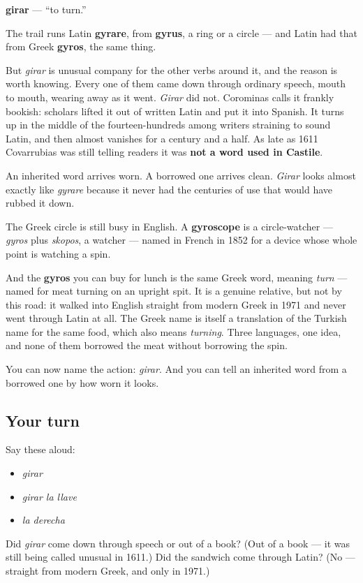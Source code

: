 \begin{cousinweb}
\textbf{girar} — \textquotedblleft{}to turn.\textquotedblright{}

The trail runs Latin \textbf{gyrare}, from \textbf{gyrus}, a ring or a circle — and Latin had that from Greek \textbf{gyros}, the same thing.

But \emph{girar} is unusual company for the other verbs around it, and the reason is worth knowing. Every one of them came down through ordinary speech, mouth to mouth, wearing away as it went. \emph{Girar} did not. Corominas calls it frankly bookish: scholars lifted it out of written Latin and put it into Spanish. It turns up in the middle of the fourteen-hundreds among writers straining to sound Latin, and then almost vanishes for a century and a half. As late as 1611 Covarrubias was still telling readers it was \textbf{not a word used in Castile}.

An inherited word arrives worn. A borrowed one arrives clean. \emph{Girar} looks almost exactly like \emph{gyrare} because it never had the centuries of use that would have rubbed it down.

The Greek circle is still busy in English. A \textbf{gyroscope} is a circle-watcher — \emph{gyros} plus \emph{skopos}, a watcher — named in French in 1852 for a device whose whole point is watching a spin.

And the \textbf{gyros} you can buy for lunch is the same Greek word, meaning \emph{turn} — named for meat turning on an upright spit. It is a genuine relative, but not by this road: it walked into English straight from modern Greek in 1971 and never went through Latin at all. The Greek name is itself a translation of the Turkish name for the same food, which also means \emph{turning}. Three languages, one idea, and none of them borrowed the meat without borrowing the spin.
\end{cousinweb}

\begin{grammarlens}[title={What you've built}]
You can now name the action: \emph{girar}. And you can tell an inherited word from a borrowed one by how worn it looks.
\end{grammarlens}

\subsection*{Your turn}
Say these aloud:

\begin{itemize}
\raggedright
  \item \emph{girar}
  \item \emph{girar la llave}
  \item \emph{la derecha}
\end{itemize}

\begin{tcolorbox}[breakable,colback=teal!4,colframe=teal!35!black,title={Before you move on}]
Did \emph{girar} come down through speech or out of a book? (Out of a book — it was still being called unusual in 1611.) Did the sandwich come through Latin? (No — straight from modern Greek, and only in 1971.)
\end{tcolorbox}
